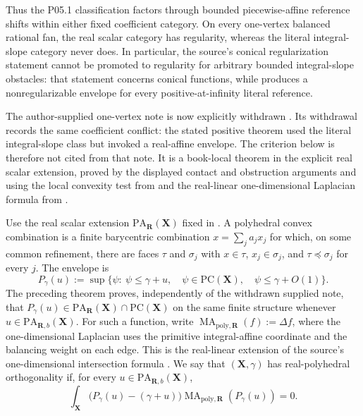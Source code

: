 \documentclass[11pt,a4paper]{article}
\theoremstyle{definition}
\theoremstyle{remark}
\DeclareMathOperator{\MA}{MA}
\begin{document}
Thus the P05.1 classification factors through bounded piecewise-affine
reference shifts within either fixed coefficient category.  On every
one-vertex balanced rational fan, the real scalar category has regularity,
whereas the literal integral-slope category never does.  In particular, the
source's conical regularization statement cannot be promoted to regularity
for arbitrary bounded integral-slope obstacles: that statement concerns
conical functions, while
 produces a
nonregularizable envelope for every positive-at-infinity literal reference.

The author-supplied one-vertex note is now explicitly withdrawn
\cite{SuppliedP05220260925}.  Its withdrawal records the same coefficient
conflict: the stated positive theorem used the literal integral-slope class
but invoked a real-affine envelope.  The criterion below is therefore not
cited from that note.  It is a book-local theorem in the explicit real
scalar extension, proved by the displayed contact and obstruction arguments
and using the local convexity test from
\cite[Definitions~3.2--3.3]{BMPS26} and the real-linear one-dimensional
Laplacian formula from
\cite[Definition~6.15 and Proposition~6.17]{BMPS26}.



Use the real scalar extension
$\mathrm{PA}_{\mathbf R}(\mathbf X)$ fixed in
.  A
polyhedral convex combination is a finite barycentric combination
$x=\sum_j a_jx_j$ for which, on some common refinement, there are faces
$\tau$ and $\sigma_j$ with $x\in\tau$, $x_j\in\sigma_j$, and
$\tau\preceq\sigma_j$ for every $j$.  The envelope is
\[
 P_\gamma(u):=\sup\{\psi:\ \psi\leq\gamma+u,\quad
   \psi\in\mathrm{PC}(\mathbf X),\quad
   \psi\leq\gamma+O(1)\}.
\]
The preceding theorem proves, independently of the withdrawn supplied note, that
$P_\gamma(u)\in\mathrm{PA}_{\mathbf R}(\mathbf X)\cap
\mathrm{PC}(\mathbf X)$ on the same finite structure whenever
$u\in\mathrm{PA}_{\mathbf R,b}(\mathbf X)$.  For such a function, write
$\MA_{\mathrm{poly},\mathbf R}(f):=\Delta f$, where the
one-dimensional Laplacian uses the primitive integral-affine coordinate
and the balancing weight on each edge.  This is the real-linear extension
of the source's one-dimensional intersection formula
\cite[Definition~6.15 and Proposition~6.17]{BMPS26}.
We say that $(\mathbf X,\gamma)$ has real-polyhedral orthogonality if, for
every $u\in\mathrm{PA}_{\mathbf R,b}(\mathbf X)$,
\[
 \int_{\mathbf X}
 \bigl(P_\gamma(u)-(\gamma+u)\bigr)
 \MA_{\mathrm{poly},\mathbf R}(P_\gamma(u))=0.
\]
\end{document}
